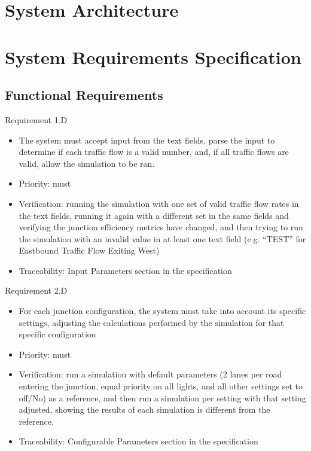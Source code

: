 \documentclass{article}
\begin{document}
\section{System Architecture}

\section{System Requirements Specification}
\subsection{Functional Requirements}
Requirement 1.D
\begin{itemize}
  \item The system must accept input from the text fields, parse the input to determine if each traffic flow is a valid number, and, if all traffic flows are valid, allow the simulation to be ran.
  \item Priority: must
  \item Verification: running the simulation with one set of valid traffic flow rates in the text fields, running it again with a different set in the same fields and verifying the junction efficiency metrics have changed, and then trying to run the simulation with an invalid value in at least one text field (e.g. “TEST” for Eastbound Traffic Flow Exiting West)
  \item Traceability: Input Parameters section in the specification
\end{itemize}

Requirement 2.D
\begin{itemize}
  \item For each junction configuration, the system must take into account its specific settings, adjusting the calculations performed by the simulation for that specific configuration
  \item Priority: must
  \item Verification: run a simulation with default parameters (2 lanes per road entering the junction, equal priority on all lights, and all other settings set to off/No) as a reference, and then run a simulation per setting with that setting adjusted, showing the results of each simulation is different from the reference.
  \item Traceability: Configurable Parameters section in the specification
\end{itemize}
\end{document}
